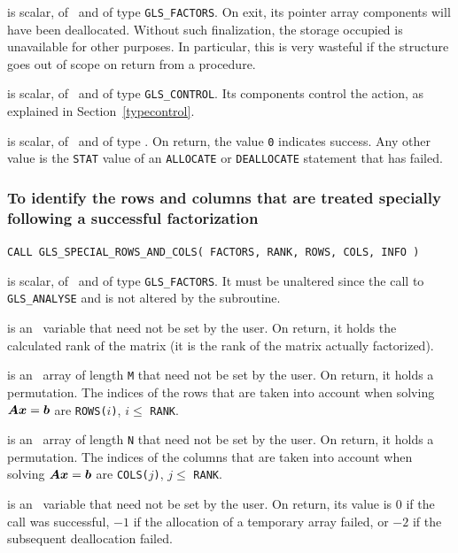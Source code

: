 \documentclass{galahad}
\newcommand{\packagename}{GLS}
\begin{document}
\vspace*{-1mm}
\begin{description}

 is scalar, of \intentinout\ and of type
{\tt \packagename\_FACTORS}. On exit, its pointer array components will have
been deallocated.  Without such finalization, the storage occupied is 
unavailable for other purposes. In particular, this is very wasteful 
if the structure goes out of scope on return from a procedure.

 is scalar, of \intentin\ and of type {\tt \packagename\_CONTROL}. 
Its components control the action, as explained in
Section~\ref{typecontrol}.

 is scalar, of \intentout\ and of type \integer.  On return,
the value {\tt 0} indicates success. Any other value is the {\tt STAT} value of
an {\tt ALLOCATE} or {\tt DEALLOCATE} statement that has failed.

\end{description}


\subsubsection{ To identify the rows and columns that are treated specially
         following a successful factorization}

\hspace{8mm}
{\tt CALL \packagename\_SPECIAL\_ROWS\_AND\_COLS( FACTORS, RANK, ROWS, COLS, 
INFO )}

\begin{description}

 is scalar, of \intentin\ and of type {\tt \packagename\_FACTORS}. 
It must be unaltered since the call to {\tt \packagename\_ANALYSE} and is 
not altered by the subroutine.

 is an \integer\ variable that need not be set by the user. On
return, it holds the calculated rank of the matrix (it is the rank of the
matrix actually factorized).

 is an \integer\ array of length {\tt M} that need not be set by the
user. On return, it holds a permutation. The indices of the rows that
are taken into account when solving ${\bm{A}} {\bm{x}} = {\bm{b}}$
are {\tt ROWS(}$i${\tt )}, $i \leq$ {\tt RANK}.

 is an \integer\ array of length {\tt N} that need not be set by the
user. On return, it holds a permutation. The indices of the columns that
are taken into account when solving ${\bm{A}} {\bm{x}} = {\bm{b}}$
are {\tt COLS(}$j${\tt )}, $j \leq$ {\tt RANK}.

 is an \integer\ variable that need not be set by the user. On
return, its value is $0$ if the call was successful, $-1$ if the allocation
of a temporary array failed, or $-2$ if the subsequent deallocation
failed.

\end{description}
\end{document}
